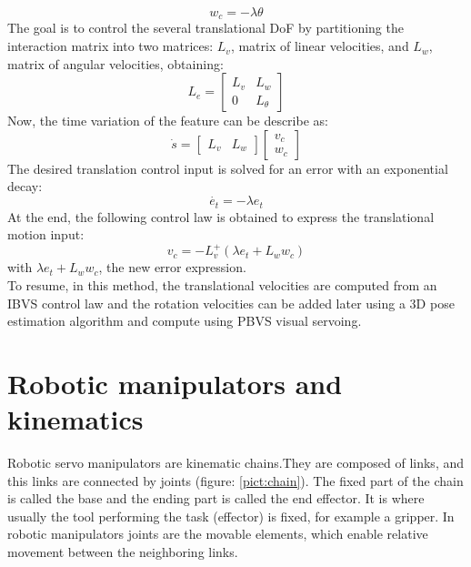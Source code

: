 \begin{equation}
    w_c = - \lambda \theta
\end{equation}
\newpage
The goal is to control the several translational DoF by partitioning the interaction matrix into two matrices: $L_v$, matrix of linear velocities, and $L_w$, matrix of angular velocities, obtaining:
\begin{equation}
    L_e
=
\begin{bmatrix}
   L_v & L_w \\
    0 & L_\theta
\end{bmatrix}
\end{equation}
Now, the time variation of the feature can be describe as:
\begin{equation}
    \Dot{s}
=
\begin{bmatrix}
   L_v & L_w 
\end{bmatrix}
\begin{bmatrix}
   v_c \\ 
   w_c
\end{bmatrix}
\end{equation}
The desired translation control input is solved for an error with an exponential decay:
\begin{equation}
    \Dot{e_t} = -\lambda e_t
\end{equation}
At the end, the following control law is obtained to express the translational motion input:
\begin{equation}
    v_c = - L_v^+(\lambda e_t + L_w w_c)
\end{equation}
 with $\lambda e_t + L_w w_c$, the new error expression. \\

To resume, in this method, the translational velocities are computed from an IBVS control law and the rotation velocities can be added later using a 3D pose estimation algorithm and compute using PBVS visual servoing. 


\section{Robotic manipulators and kinematics}
\label{Robotic_manipulator}

Robotic servo manipulators are kinematic chains.They are composed of links, and this links are connected by joints (figure: \ref{pict:chain}). The fixed part of the chain is called the base and the ending part is called the end effector. It is where usually the tool performing the task (effector) is fixed, for example a gripper. In robotic manipulators joints are the movable elements, which enable relative movement between the neighboring links. \\

